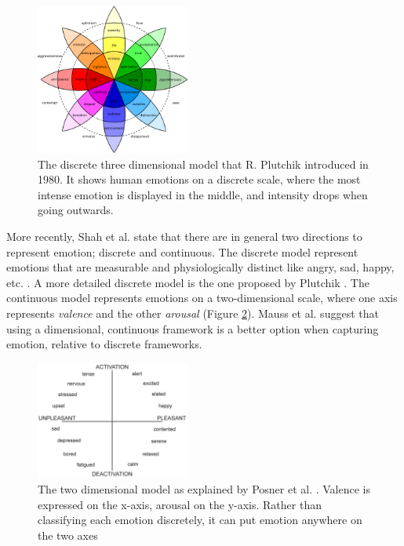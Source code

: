\documentclass{sigchi}
\begin{document}
\begin{figure}[t]
    \centering
    \includegraphics[width=0.45\textwidth]{images/PlutchikWheelOfEmotions.eps}
    \caption{The discrete three dimensional model that R. Plutchik \protect\cite{Plutchik1980} introduced in 1980. It shows human emotions on a discrete scale, where the most intense emotion is displayed in the middle, and intensity drops when going outwards.}
    \label{fig:wheel_of_emotions}
\end{figure}

More recently, Shah et al. \cite{Shah2015} state that there are in general two directions to represent emotion; discrete and continuous. The discrete model represent emotions that are measurable and physiologically distinct like angry, sad, happy, etc. \cite{Ekman1992}. A more detailed discrete model is the one proposed by Plutchik \cite{Plutchik1980}. The continuous model represents emotions on a two-dimensional scale, where one axis represents \textit{valence} and the other \textit{arousal} \cite{Posner2005} (Figure \ref{fig:circumplex_model}). Mauss et al. \cite{Mauss2009} suggest that using a dimensional, continuous framework is a better option when capturing emotion, relative to discrete frameworks. 

\begin{figure}[ht]
    \centering
    \includegraphics[width=0.45\textwidth]{images/CircumplexModel.jpg}
    \caption{The two dimensional model as explained by Posner et al. \protect\cite{Posner2005}. Valence is expressed on the x-axis, arousal on the y-axis. Rather than classifying each emotion discretely, it can put emotion anywhere on the two axes}
    \label{fig:circumplex_model}
\end{figure}
\end{document}
